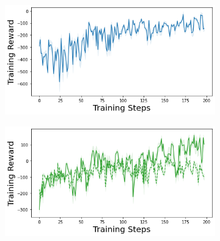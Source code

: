 \begin{figure}
    \begin{subfigure}{.245\textwidth}
        \includegraphics[width=\textwidth]{sections/011_icml2022/resources/lunarlander-training_total_reward-dkl-training-strategy.png}
    \end{subfigure}
    \begin{subfigure}{.245\textwidth}
        \includegraphics[width=\textwidth]{sections/011_icml2022/resources/lunarlander-training_total_reward-postnet-training-strategy.png}
    \end{subfigure}
    

\end{figure}

